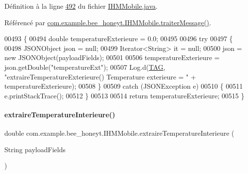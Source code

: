 Définition à la ligne \hyperlink{_i_h_m_mobile_8java_source_l00492}{492} du fichier \hyperlink{_i_h_m_mobile_8java_source}{I\+H\+M\+Mobile.\+java}.



Référencé par \hyperlink{_i_h_m_mobile_8java_source_l00374}{com.\+example.\+bee\+\_\+honeyt.\+I\+H\+M\+Mobile.\+traiter\+Message()}.


\begin{DoxyCode}
00493     \{
00494         \textcolor{keywordtype}{double} temperatureExterieure = 0.0;
00495 
00496         \textcolor{keywordflow}{try}
00497         \{
00498             JSONObject json = null;
00499             Iterator<String> it = null;
00500             json = \textcolor{keyword}{new} JSONObject(payloadFields);
00501 
00506             temperatureExterieure = json.getDouble(\textcolor{stringliteral}{"temperatureExt"});
00507             Log.d(\hyperlink{classcom_1_1example_1_1bee__honeyt_1_1_i_h_m_mobile_a366987bf9bb2ed1010b2f967d4efa263}{TAG}, \textcolor{stringliteral}{"extraireTemperatureExterieure() Temperature exterieure = "} + 
      temperatureExterieure);
00508         \}
00509         \textcolor{keywordflow}{catch} (JSONException e)
00510         \{
00511             e.printStackTrace();
00512         \}
00513 
00514         \textcolor{keywordflow}{return} temperatureExterieure;
00515     \}
\end{DoxyCode}
\mbox{\label{classcom_1_1example_1_1bee__honeyt_1_1_i_h_m_mobile_a714f52f4793f22a08a773b1bf35dd015}} 
\paragraph{\texorpdfstring{extraire\+Temperature\+Interieure()}{extraireTemperatureInterieure()}}
{\footnotesize\ttfamily double com.\+example.\+bee\+\_\+honeyt.\+I\+H\+M\+Mobile.\+extraire\+Temperature\+Interieure (\begin{DoxyParamCaption}\item[{String}]{payload\+Fields }\end{DoxyParamCaption})\hspace{0.3cm}{\ttfamily [private]}}

